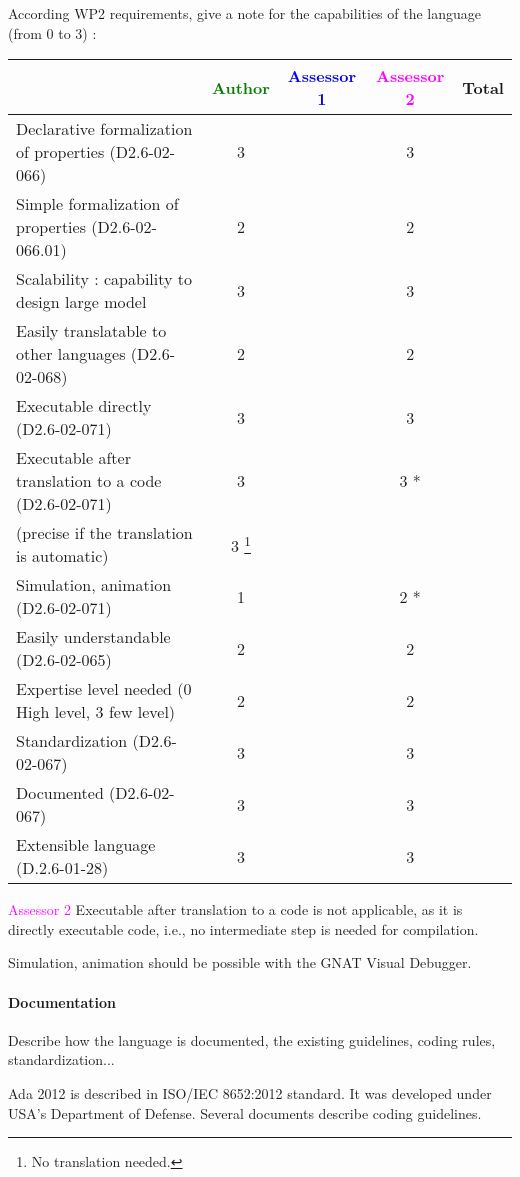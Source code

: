 According WP2 requirements, give a note for the capabilities of the language (from 0 to 3) :

\begin{tabular}{|l | c | c | c | c|}
\hline
& \textcolor{green}{Author} & \textcolor{blue}{Assessor 1} & \textcolor{magenta}{Assessor 2} & Total \\
\hline
Declarative formalization of properties (D2.6-02-066) & 3    & & 3    & \\
\hline
Simple formalization of properties (D2.6-02-066.01) & 2    & & 2    & \\
\hline
Scalability : capability to design large model & 3    & & 3    & \\
\hline
Easily translatable to other languages (D2.6-02-068) & 2    & & 2    & \\
\hline
Executable directly (D2.6-02-071) & 3    & & 3    & \\
\hline
Executable after translation to a code (D2.6-02-071) & 3    & & 3   * & \\
(precise if the translation is automatic) & 3   \footnote{No translation needed.} & & & \\
\hline
Simulation, animation (D2.6-02-071) & 1    & & 2   * & \\
\hline
Easily understandable (D2.6-02-065) & 2    & & 2    & \\
\hline
Expertise level needed (0 High level, 3 few level) & 2    & & 2    & \\
\hline
Standardization (D2.6-02-067) & 3    & & 3    & \\
\hline
Documented (D2.6-02-067) & 3    & & 3    & \\
\hline
Extensible language (D.2.6-01-28) & 3    & & 3    & \\
\hline
\end{tabular}

\textcolor{magenta}{Assessor 2} Executable after translation to a code is not
applicable, as it is directly executable code, i.e., no intermediate step is
needed for compilation.

Simulation, animation should be possible with the GNAT Visual Debugger.


\paragraph{Documentation} Describe how the language is documented, the existing guidelines, coding rules, standardization...

Ada 2012 is described in ISO/IEC 8652:2012 standard. It was developed
under USA's Department of Defense. Several documents describe coding
guidelines.


